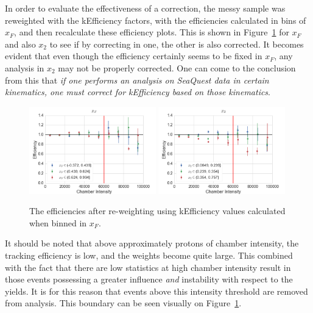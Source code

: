 In order to evaluate the effectiveness of a correction, the messy sample was reweighted with the kEfficiency factors, with the efficiencies calculated in bins of $x_F$, and then recalculate these efficiency plots. This is shown in Figure~\ref{fig:xf-keff-corrected} for $x_F$ and also $x_2$ to see if by correcting in one, the other is also corrected. It becomes evident that even though the efficiency certainly seems to be fixed in $x_F$, any analysis in $x_2$ may not be properly corrected. One can come to the conclusion from this that \emph{if one performs an analysis on SeaQuest data in certain kinematics, one must correct for kEfficiency based on those kinematics}.
\begin{figure}
	\centering
	\includegraphics[width=0.49\textwidth]{figures/analysis/xF-keff-corrected-int.png}
	\includegraphics[width=0.49\textwidth]{figures/analysis/x2-keff-corrected-int.png}
	\caption{The efficiencies after re-weighting using kEfficiency values calculated when binned in $x_F$.}
	\label{fig:xf-keff-corrected}
\end{figure}
It should be noted that above approximately \unit[60,000]{protons} of chamber intensity, the tracking efficiency is low, and the weights become quite large. This combined with the fact that there are low statistics at high chamber intensity result in those events possessing a greater influence \emph{and} instability with respect to the yields. It is for this reason that events above this intensity threshold are removed from analysis. This boundary can be seen visually on Figure~\ref{fig:xf-keff-corrected}.

